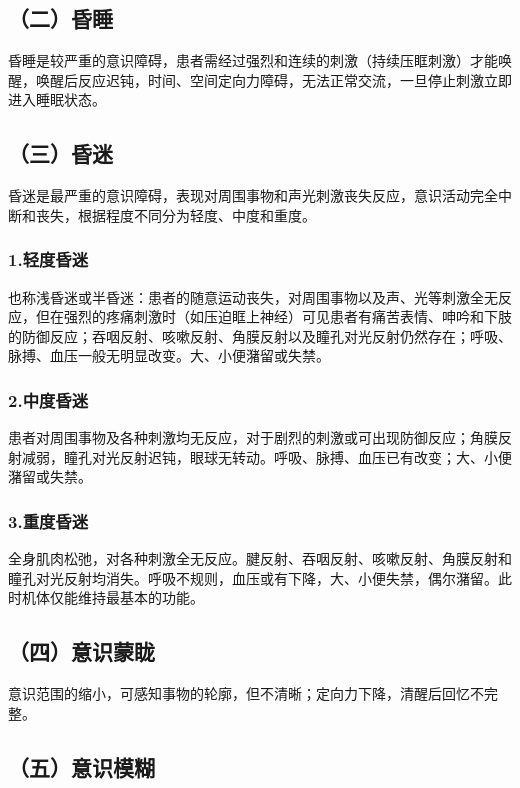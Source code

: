 \subsection{（二）昏睡}

昏睡是较严重的意识障碍，患者需经过强烈和连续的刺激（持续压眶刺激）才能唤醒，唤醒后反应迟钝，时间、空间定向力障碍，无法正常交流，一旦停止刺激立即进入睡眠状态。

\subsection{（三）昏迷}

昏迷是最严重的意识障碍，表现对周围事物和声光刺激丧失反应，意识活动完全中断和丧失，根据程度不同分为轻度、中度和重度。

\subsubsection{1.轻度昏迷}

也称浅昏迷或半昏迷：患者的随意运动丧失，对周围事物以及声、光等刺激全无反应，但在强烈的疼痛刺激时（如压迫眶上神经）可见患者有痛苦表情、呻吟和下肢的防御反应；吞咽反射、咳嗽反射、角膜反射以及瞳孔对光反射仍然存在；呼吸、脉搏、血压一般无明显改变。大、小便潴留或失禁。

\subsubsection{2.中度昏迷}

患者对周围事物及各种刺激均无反应，对于剧烈的刺激或可出现防御反应；角膜反射减弱，瞳孔对光反射迟钝，眼球无转动。呼吸、脉搏、血压已有改变；大、小便潴留或失禁。

\subsubsection{3.重度昏迷}

全身肌肉松弛，对各种刺激全无反应。腱反射、吞咽反射、咳嗽反射、角膜反射和瞳孔对光反射均消失。呼吸不规则，血压或有下降，大、小便失禁，偶尔潴留。此时机体仅能维持最基本的功能。

\subsection{（四）意识蒙眬}

意识范围的缩小，可感知事物的轮廓，但不清晰；定向力下降，清醒后回忆不完整。

\subsection{（五）意识模糊}

